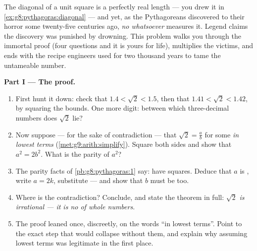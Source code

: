 \begin{problem}
\label{pb:g9:sqrt:1}
The diagonal of a unit square is a perfectly real length --- you
drew it in \cref{ex:g8:pythagoras:diagonal} --- and yet, as the
Pythagoreans discovered to their horror some twenty-five
centuries ago, \emph{no  whatsoever} measures it. Legend
claims the discovery was punished by drowning. This problem walks
you through the immortal proof (four questions and it is yours
for life), multiplies the victims, and ends with the recipe
engineers used for two thousand years to tame the untameable
number.

\medskip
\noindent\textbf{Part I --- The proof.}
\begin{enumerate}
  \item First hunt it down: check that
        $1.4 < \sqrt2 < 1.5$, then that $1.41 < \sqrt2 < 1.42$,
        by squaring the bounds. One more digit: between which
        three-decimal numbers does $\sqrt2$ lie?
  \item Now suppose --- for the sake of contradiction --- that
        $\sqrt2 = \frac ab$ for some  \emph{in lowest
        terms} (\cref{met:g9:arith:simplify}). Square both sides
        and show that $a^2 = 2 b^2$. What is the parity of
        $a^2$?
  \item The parity facts of \cref{pb:g8:pythagoras:1} say:  have  squares. Deduce that $a$ is , write
        $a = 2k$, substitute --- and show that $b$ must be 
        too.
  \item Where is the contradiction? Conclude, and state the
        theorem in full: \emph{$\sqrt2$ is irrational --- it is
        no  of whole numbers}.
  \item The proof leaned once, discreetly, on the words ``in
        lowest terms''. Point to the exact step that would
        collapse without them, and explain why assuming lowest
        terms was legitimate in the first place.
\end{enumerate}


\end{problem}

